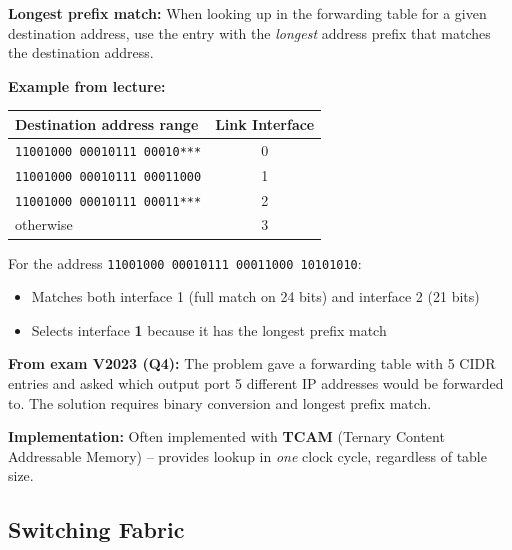 \begin{exambox}
\textbf{Longest prefix match:} When looking up in the forwarding table for a given destination address, use the entry with the \emph{longest} address prefix that matches the destination address.

\medskip
\textbf{Example from lecture:}

\begin{center}
\begin{tabular}{lc}
\toprule
\textbf{Destination address range} & \textbf{Link Interface} \\
\midrule
\texttt{11001000 00010111 00010***} & 0 \\
\texttt{11001000 00010111 00011000} & 1 \\
\texttt{11001000 00010111 00011***} & 2 \\
otherwise & 3 \\
\bottomrule
\end{tabular}
\end{center}

For the address \texttt{11001000 00010111 00011000 10101010}:
\begin{itemize}[noitemsep]
    \item Matches both interface 1 (full match on 24 bits) and interface 2 (21 bits)
    \item Selects interface \textbf{1} because it has the longest prefix match
\end{itemize}

\medskip
\textbf{From exam V2023 (Q4):} The problem gave a forwarding table with 5 CIDR entries and asked which output port 5 different IP addresses would be forwarded to. The solution requires binary conversion and longest prefix match.

\medskip
\textbf{Implementation:} Often implemented with \textbf{TCAM} (Ternary Content Addressable Memory) -- provides lookup in \emph{one} clock cycle, regardless of table size.
\end{exambox}

\subsection{Switching Fabric}

